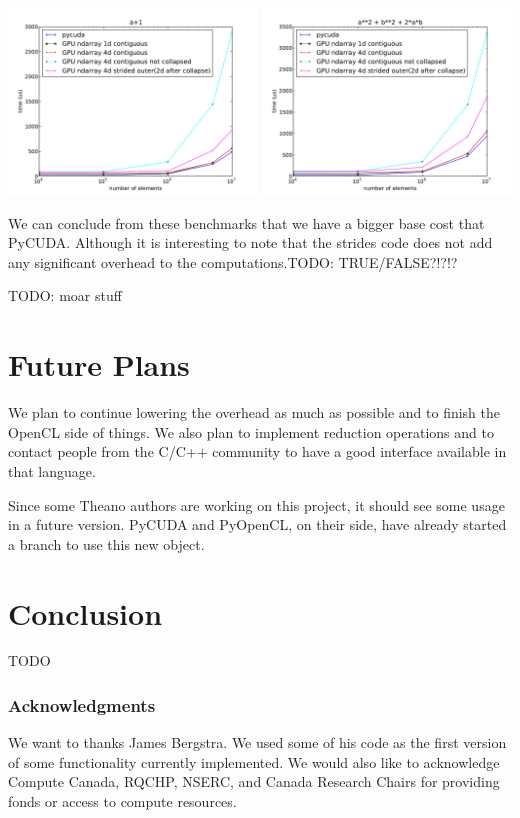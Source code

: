 \documentclass{article} %
\begin{document}
\includegraphics[width=0.495\textwidth]{ap1_no_alloc}
\includegraphics[width=0.495\textwidth]{a2pb2p2ab_no_alloc}

We can conclude from these benchmarks that we have a bigger base cost that PyCUDA.
Although it is interesting to note that the strides code does not add any significant overhead to the computations.TODO: TRUE/FALSE?!?!?

TODO: moar stuff

\section{Future Plans}

We plan to continue lowering the overhead as much as possible and to finish the OpenCL side of things.
We also plan to implement reduction operations and to contact people from the C/C++ community to have a good interface available in
that language.

Since some Theano authors are working on this project, it should see some usage in a future version. PyCUDA and PyOpenCL, on their side, have already started a branch to use this new object.

\section{Conclusion}

TODO

\subsubsection*{Acknowledgments}

We want to thanks James Bergstra. We used some of his code as the first version of some functionality currently implemented. We would also like to acknowledge Compute Canada, RQCHP, NSERC, and Canada Research Chairs for providing fonds or access to compute resources.




\end{document}
